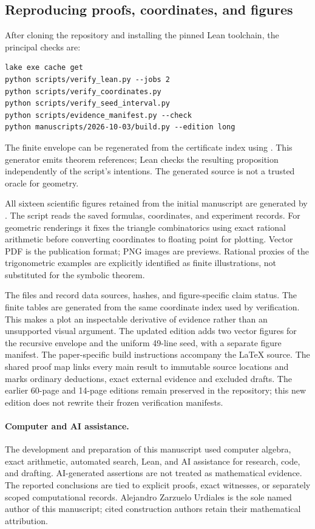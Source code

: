 \subsection{Reproducing proofs, coordinates, and figures}

After cloning the repository and installing the pinned Lean toolchain, the principal checks are:
\begin{lstlisting}
lake exe cache get
python scripts/verify_lean.py --jobs 2
python scripts/verify_coordinates.py
python scripts/verify_seed_interval.py
python scripts/evidence_manifest.py --check
python manuscripts/2026-10-03/build.py --edition long
\end{lstlisting}
The finite envelope can be regenerated from the certificate index using . This generator emits theorem references; Lean checks the resulting proposition independently of the script's intentions. The generated source is not a trusted oracle for geometry.

All sixteen scientific figures retained from the initial manuscript are generated by . The script reads the saved formulas, coordinates, and experiment records. For geometric renderings it fixes the triangle combinatorics using exact rational arithmetic before converting coordinates to floating point for plotting. Vector PDF is the publication format; PNG images are previews. Rational proxies of the trigonometric examples are explicitly identified as finite illustrations, not substituted for the symbolic theorem.

The files  and  record data sources, hashes, and figure-specific claim status. The finite tables are generated from the same coordinate index used by verification. This makes a plot an inspectable derivative of evidence rather than an unsupported visual argument. The updated edition adds two vector figures for the recursive envelope and the uniform 49-line seed, with a separate figure manifest. The paper-specific build instructions accompany the LaTeX source. The shared proof map links every main result to immutable source locations and marks ordinary deductions, exact external evidence and excluded drafts. The earlier 60-page and 14-page editions remain preserved in the repository; this new edition does not rewrite their frozen verification manifests.

\paragraph{Computer and AI assistance.}
The development and preparation of this manuscript used computer algebra, exact arithmetic, automated search, Lean, and AI assistance for research, code, and drafting. AI-generated assertions are not treated as mathematical evidence. The reported conclusions are tied to explicit proofs, exact witnesses, or separately scoped computational records. Alejandro Zarzuelo Urdiales is the sole named author of this manuscript; cited construction authors retain their mathematical attribution.
